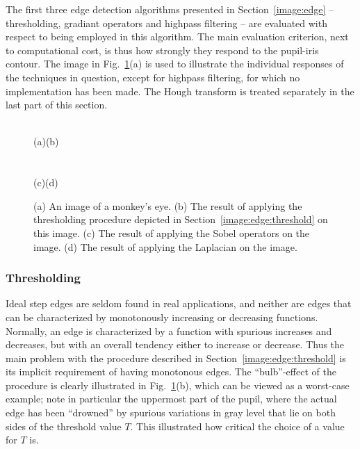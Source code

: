The first three edge detection algorithms presented in
Section~\ref{image:edge} -- thresholding, gradiant operators and
highpass filtering -- are evaluated with respect to being employed in
this algorithm.  The main evaluation criterion, next to computational
cost, is thus how strongly they respond to the pupil-iris contour. The
image in Fig.~\ref{fig:compare}(a) is used to illustrate the individual
responses of the techniques in question, except for highpass
filtering, for which no implementation has been made.  The Hough
transform is treated separately in the last part of this section.

\begin{figure}[tb]
  \textwidth
  \\
  \hspace*{0.28\textwidth}(a)\hspace*{0.38\textwidth}(b)
  \paragraph{}
  \\
  \hspace*{0.28\textwidth}(c)\hspace*{0.38\textwidth}(d)
  \caption{\label{fig:compare}(a) An image of a monkey's eye.  (b) The
    result of applying the thresholding procedure depicted in
    Section~\protect\ref{image:edge:threshold} on this image.  (c) The
    result of applying the Sobel operators on the image.  (d) The
    result of applying the Laplacian on the image.}
\end{figure}

\subsubsection{Thresholding}

Ideal step edges are seldom found in real applications, and neither
are edges that can be characterized by monotonously increasing or
decreasing functions.  Normally, an edge is characterized by a
function with spurious increases and decreases, but with an overall
tendency either to increase or decrease.  Thus the main problem with
the procedure described in Section~\ref{image:edge:threshold} is its
implicit requirement of having monotonous edges.  The ``bulb''-effect
of the procedure is clearly illustrated in Fig.~\ref{fig:compare}(b),
which can be viewed as a worst-case example; note in particular the
uppermost part of the pupil, where the actual edge has been
``drowned'' by spurious variations in gray level that lie on both
sides of the threshold value $T$.  This illustrated how critical the
choice of a value for $T$ is.

